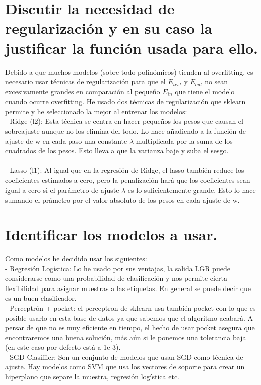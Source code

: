 \documentclass[12pt]{article}
\begin{document}
\section{Discutir la necesidad de regularización y en su caso la justificar la función usada para ello.}

Debido a que muchos modelos (sobre todo polinómicos) tienden al overfitting, es necesario usar técnicas de regularización para que el $E_{test}$ y $E_{out}$ no sean excesivamente grandes en comparación al pequeño $E_{in}$ que tiene el modelo cuando ocurre overfitting. He usado dos técnicas de regularización que sklearn permite y he seleccionado la mejor al entrenar los modelos:\\
- Ridge (l2): Esta técnica se centra en hacer pequeños los pesos que causan el sobreajuste aunque no los elimina del todo. Lo hace añadiendo a la función de ajuste de w en cada paso una constante $\lambda$ multiplicada por la suma de los cuadrados de los pesos. Esto lleva a que la varianza baje y suba el sesgo.\\\\
- Lasso (l1): Al igual que en la regresión de Ridge, el lasso también reduce los coeficientes estimados a cero, pero la penalización hará que los coeficientes sean igual a cero si el parámetro de ajuste $\lambda$ es lo suficientemente grande. Esto lo hace sumando el prámetro por el valor absoluto de los pesos en cada ajuste de w.


\section{Identificar los modelos a usar.}

Como modelos he decidido usar los siguientes:\\
- Regresión Logística: Lo he usado por sus ventajas, la salida LGR puede considerarse como una probabilidad de clasificación y nos permite cierta flexibilidad para asignar muestras a las etiquetas. En general se puede decir que es un buen clasificador.\\
- Perceptrón + pocket: el perceptron de sklearn usa también pocket con lo que es posible usarlo en esta base de datos ya que sabemos que el algoritmo acabará. A persar de que no es muy eficiente en tiempo, el hecho de usar pocket asegura que encontraremos una buena solución, más aún si le ponemos una tolerancia baja (en este caso por defecto está a 1e-3).\\
-  SGD Clasiffier: Son un conjunto de modelos que usan SGD como técnica de ajuste. Hay modelos como SVM que usa los vectores de soporte para crear un hiperplano que separe la muestra, regresión logística etc.
\end{document}
